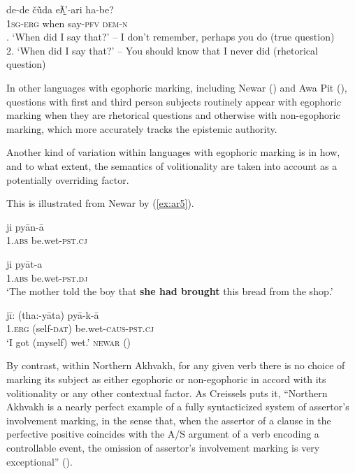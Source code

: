 \documentclass[output=paper]{langsci/langscibook}
\begin{document}
\begin{exe}
	\ex \label{ex:ar4}
	\gll de-de čũda	eƛ̱’-ari	ha-be?\\
	1\textsc{sg}-\textsc{erg}	when say-\textsc{pfv} \textsc{dem}-\textsc{n}\\
	. ‘When did I say that?’ – I don’t remember, perhaps you do (true question)\\
	2. ‘When did I say that?’ – You should know that I never did (rhetorical question) \cite[11]{Creissels2008}
\end{exe}

In other languages with egophoric marking, including Newar (\citealt[249]{HaleWatters1973}) and Awa Pit (\citealt[614-615]{Curnow2002a}), questions with first and third person subjects routinely appear with egophoric marking when they are rhetorical questions and otherwise with non-egophoric marking, which more accurately tracks the epistemic authority.
 
Another kind of variation within languages with egophoric marking is in how, and to what extent, the semantics of volitionality are taken into account as a potentially overriding factor.

This is illustrated from Newar by (\ref{ex:ar5}).

\begin{exe}
	\ex \label{ex:ar5}
	\begin{xlist}
		\ex \label{ex:ar5a}
		\gll *ji pyān-ā\\
		1.\textsc{abs} be.wet-\textsc{pst}.\textsc{cj}\\
		\trans

		\ex \label{ex:ar5b}
		\gll ji pyāt-a\\
		1.\textsc{abs} be.wet-\textsc{pst}.\textsc{dj}\\
		\trans ‘The mother told the boy that \textbf{she had brought} this bread from the shop.’
		
		\ex \label{ex:ar5c}
		\gll jī: (tha:-yāta) pyā-k-ā\\
		1.\textsc{erg} (self-\textsc{dat}) be.wet-\textsc{caus}-\textsc{pst}.\textsc{cj}\\
		\trans ‘I got (myself) wet.’ \textsc{newar} (\citealt[29]{Hargreaves2005})
	\end{xlist}	
\end{exe}

By contrast, within Northern Akhvakh, for any given verb there is no choice of marking its subject as either egophoric or non-egophoric in accord with its volitionality or any other contextual factor.  As Creissels puts it, “Northern Akhvakh is a nearly perfect example of a fully syntacticized system of assertor’s involvement marking, in the sense that, when the assertor of a clause in the perfective positive coincides with the A/S argument of a verb encoding a controllable event, the omission of assertor’s involvement marking is very exceptional” (\citealt[12--13]{Creissels2008}).
\end{document}
